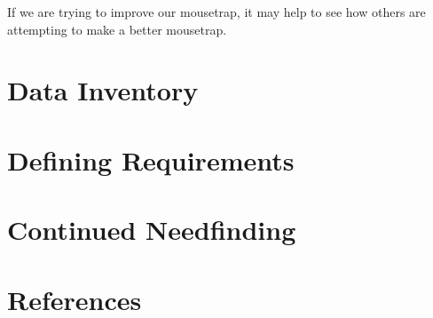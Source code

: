\documentclass[
	letterpaper, %
]{jdf}
\begin{document}
If we are trying to improve our mousetrap, it may help to see how others are attempting to make a better mousetrap.




\section{Data Inventory}

\section{Defining Requirements}

\section{Continued Needfinding}

\section{References}

\printbibliography[heading=none]
\end{document}
